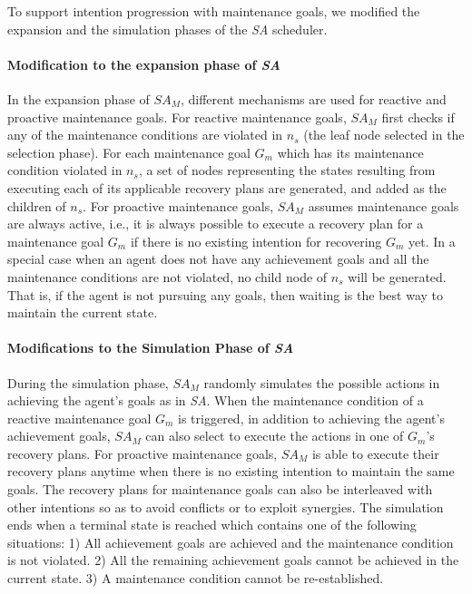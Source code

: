 \documentclass[a0,landscape]{a0poster}
\newcommand{\SA}{\emph{SA}\xspace}
\newcommand{\SAM}{\emph{$SA_M$}\xspace}
\begin{document}
\begin{multicols}{4}
To support intention progression with maintenance goals, we modified the expansion and the simulation phases of the \SA scheduler.
%
\paragraph*{Modification to the expansion phase of \SA}
%
In the expansion phase of \SAM, different mechanisms are used for reactive and proactive maintenance goals.
%
For reactive maintenance goals, \SAM first checks if any of the maintenance conditions are violated in $n_s$ (the leaf node selected in the selection phase).
%
For each maintenance goal $G_m$ which has its maintenance condition violated in $n_s$,
a set of nodes representing the states resulting from executing each of its applicable recovery plans are generated, and added as the children of $n_s$.
%
%
For proactive maintenance goals, \SAM assumes maintenance goals are always active, i.e., it is always possible to execute a recovery plan for a maintenance goal $G_m$ if there is no existing intention for recovering $G_m$ yet.
%
In a special case when an agent does not have any achievement goals and all the maintenance conditions are not violated, no child node of $n_s$ will be generated. That is, if the agent is not pursuing any goals, then waiting is the best way to maintain the current state.
%
\paragraph{\textbf{Modifications to the Simulation Phase of \SA}}
During the simulation phase, \SAM randomly simulates the possible actions in achieving the agent's goals as in \SA. When the maintenance condition of a reactive maintenance goal $G_m$ is triggered, in addition to achieving the agent's achievement goals, \SAM can also select to execute the actions in one of $G_m$'s recovery plans.
%
For proactive maintenance goals, \SAM is able to execute their recovery plans anytime when there is no existing intention to maintain the same goals. The recovery plans for maintenance goals can also be interleaved with other intentions so as to avoid conflicts or to exploit synergies. %
%
The simulation ends when a terminal state is reached which contains one of the following situations:
1) All achievement goals are achieved and the maintenance condition is not violated.
2) All the remaining achievement goals cannot be achieved in the current state.
3) A maintenance condition cannot be re-established.



\end{multicols}
\end{document}
